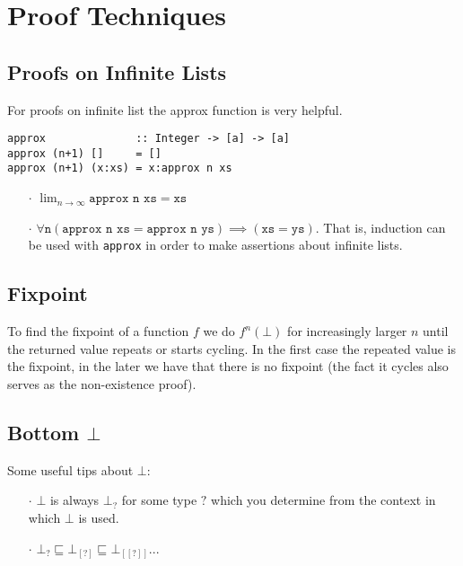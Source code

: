 \documentclass[12pt]{article}
\newcommand{\sse}{\sqsubseteq}
\newcommand{\point}[1]{\begin{itemize} \item[$\cdot$] #1 \end{itemize}}
\begin{document}
 
\section*{Proof Techniques}
\subsection*{Proofs on Infinite Lists}
For proofs on infinite list the approx function is very helpful.
\begin{verbatim}
approx              :: Integer -> [a] -> [a]
approx (n+1) []     = []
approx (n+1) (x:xs) = x:approx n xs
\end{verbatim}

\point{ $\lim_{n \to \infty} \texttt{approx n xs} = \texttt{xs}$ }
\point{$\forall \texttt{n} (\texttt{approx n xs} = \texttt{approx n ys}) \implies (\texttt{xs}=\texttt{ys})$. That is, induction can be used with \texttt{approx} in order to make assertions about infinite lists.}

\subsection*{Fixpoint}
To find the fixpoint of a function $f$ we do $f^n (\bot)$ for increasingly larger $n$ until the returned value repeats or starts cycling. In the first case the repeated value is the fixpoint, in the later we have that there is no fixpoint (the fact it cycles also serves as the non-existence proof).

\subsection*{Bottom $\bot$}
Some useful tips about $\bot$:
\point{$\bot$ is always $\bot_?$ for some type $?$ which you determine from the context in which $\bot$ is used.}
\point{$\bot_{?} \sse \bot_{[?]} \sse \bot_{[[?]]} ...$}
\end{document}
